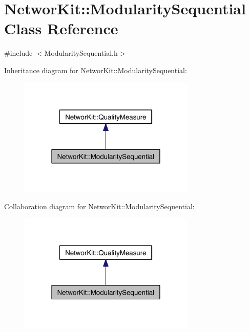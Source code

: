 \hypertarget{class_networ_kit_1_1_modularity_sequential}{\section{Networ\-Kit\-:\-:Modularity\-Sequential Class Reference}
\label{class_networ_kit_1_1_modularity_sequential}
}


{\ttfamily \#include $<$Modularity\-Sequential.\-h$>$}



Inheritance diagram for Networ\-Kit\-:\-:Modularity\-Sequential\-:\nopagebreak
\begin{figure}[H]
\begin{center}
\leavevmode
\includegraphics[width=238pt]{class_networ_kit_1_1_modularity_sequential__inherit__graph}
\end{center}
\end{figure}


Collaboration diagram for Networ\-Kit\-:\-:Modularity\-Sequential\-:\nopagebreak
\begin{figure}[H]
\begin{center}
\leavevmode
\includegraphics[width=238pt]{class_networ_kit_1_1_modularity_sequential__coll__graph}
\end{center}
\end{figure}
